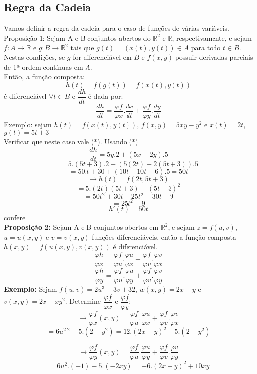 \documentclass{article}
\begin{document}
	\subsection{Regra da Cadeia}
		Vamos definir a regra da cadeia para o caso de funções de várias variáveis.\\
		Proposição 1: Sejam A e B conjuntos abertos do $\mathbb{R}^2$ e $\mathbb{R}$, respectivamente, e sejam $f:A \to \mathbb{R}$ e $g:B \to \mathbb{R}^2$ tais que $g(t) = (x(t),y(t)) \in A$ para todo $t \in B$. Nestas condições, se $g$ for diferenciável em $B$ e $f(x,y)$ possuir derivadas parciais de 1ª ordem contínuas em $A$.\\
		Então, a função composta:\\
			$$h(t)= f(g(t))=f(x(t),y(t))$$
		é diferenciável $\forall t \in B$ e $\dfrac{dh}{dt}$ é dada por:
			$$\dfrac{dh}{dt} = \dfrac{\varphi f}{\varphi x}. \dfrac{dx}{dt}+\dfrac{\varphi f}{\varphi y}.\dfrac{dy}{dt}$$
		Exemplo: sejam $h(t)=f(x(t),y(t))$, $f(x,y)=5xy-y^2$ e $x(t) = 2t$, $y(t)=5t+3$\\
		Verificar que neste caso vale (*). Usando (*)\\
		$$\dfrac{dh}{dt} = 5y.2+(5x-2y).5$$
		$$=5.(5t+3).2+(5(2t)-2(5t+3)).5$$
		$$=50.t+30+(10t-10t-6).5 = 50t$$
		$$\to h(t) = f(2t,5t+3)$$
		$$=5.(2t)(5t+3)-(5t+3)^2$$
		$$=50t^2+30t-25t^2-30t-9$$
		$$= 25t^2-9$$
		$$h'(t) = 50t$$
		confere\\
		\textbf{Proposição 2:} Sejam A e B conjuntos abertos em $\mathbb{R}^2$, e sejam $z=f(u,v)$, $u=u(x,y)$ e $v=v(x,y)$ funções diferenciáveis, então a função composta $h(x,y) = f(u(x,y),v(x,y))$ é diferenciável.
		$$\dfrac{\varphi h}{\varphi x} = \dfrac{\varphi f}{\varphi u} . \dfrac{\varphi u}{\varphi x} +\dfrac{\varphi f}{\varphi v}. \dfrac{\varphi v}{\varphi x}$$
		$$\dfrac{\varphi h}{\varphi y} = \dfrac{\varphi f}{\varphi u}.\dfrac{\varphi u}{\varphi y}+\dfrac{\varphi f}{\varphi v}.\dfrac{\varphi v}{\varphi y}$$
		\textbf{Exemplo:} Sejam $f(u,v) =2u^3-3v+3	2$, $w(x,y)=2x-y$ e $v(x,y)=2x - xy^2$. Determine $\dfrac{\varphi f}{\varphi x}$ e $\dfrac{\varphi f}{\varphi y}$:
		$$\to \dfrac{\varphi f}{\varphi x}(x,y)=\dfrac{\varphi f}{\varphi u}.\dfrac{\varphi u}{\varphi x} + \dfrac{\varphi f}{\varphi v}. \dfrac{\varphi v}{\varphi x}$$	
		$$= 6u^2.2-5.(2-y^2)= 12.(2x-y)^2-5.(2-y^2)$$		
		
		$$\to \dfrac{\varphi f}{\varphi y}(x,y)= \dfrac{\varphi f}{\varphi u}.\dfrac{\varphi u}{\varphi y}+ \dfrac{\varphi f}{\varphi v}.\dfrac{\varphi v}{\varphi y}$$
		$$= 6u^2.(-1)-5.(-2xy)= -6.(2x-y)^2+10xy$$
		
\end{document}
